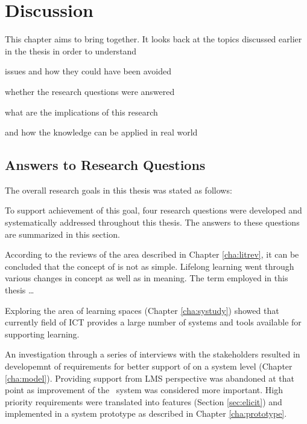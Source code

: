 \chapter{Discussion\label{cha:discussion}}
This chapter aims to bring together. It looks back at the topics
discussed earlier in the thesis in order to understand 

issues and how they could have been avoided

whether the research questions were answered

what are the implications of this research 

and how the knowledge can be applied in real world

\section{Answers to Research Questions}

The overall research goals in this thesis was stated as follows:


To support achievement of this goal, four research questions were developed and
systematically addressed throughout this thesis. The answers to these questions
are summarized in this section.


According to the reviews of the area described in Chapter \ref{cha:litrev}, it
can be concluded that the concept of \LLLs is not as simple. Lifelong learning
went through various changes in concept as well as in meaning. The term employed
in this thesis \ldots


Exploring the area of learning spaces (Chapter \ref{cha:systudy}) showed that
currently field of ICT provides a large number of systems and tools available
for supporting learning.


An investigation through a series of interviews with the stakeholders resulted
in developemnt of requirements for better support of \LLLs on a system level
(Chapter \ref{cha:model}). Providing support from LMS perspective was abandoned
at that point as improvement of the \ep~system was considered more important.
High priority requirements were translated into features (Section
\ref{sec:elicit}) and implemented in a system prototype as described in Chapter
\ref{cha:prototype}.


